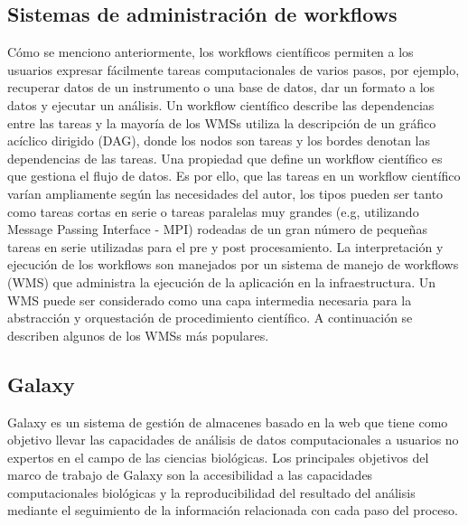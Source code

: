 


\subsection{Sistemas de administración de workflows}

Cómo se menciono anteriormente, los workflows científicos permiten a los usuarios expresar fácilmente tareas computacionales de varios pasos, por ejemplo, recuperar datos de un instrumento o una base de datos, dar un formato a los datos y ejecutar un análisis. 
Un workflow científico describe las dependencias entre las tareas y la mayoría de los WMSs utiliza la descripción de un gráfico acíclico dirigido (DAG), donde los nodos son tareas y los bordes denotan las dependencias de las tareas.
Una propiedad que define un workflow científico es que gestiona el flujo de datos. Es por ello, que las tareas en un  workflow científico varían ampliamente según las necesidades del autor, los tipos pueden ser tanto como tareas cortas en serie o tareas paralelas muy grandes (e.g, utilizando Message Passing Interface - MPI) rodeadas de un gran número de pequeñas tareas en serie utilizadas para el pre y post procesamiento.
La interpretación y ejecución de los workflows son manejados por un sistema de manejo de workflows (WMS) que administra la ejecución de la aplicación en la infraestructura. 
Un WMS puede ser considerado como una capa intermedia necesaria para la abstracción y orquestación de procedimiento científico. A continuación se describen algunos de los WMSs más populares.

\subsection{Galaxy}	
Galaxy \cite{goecks2010galaxy} es un sistema de gestión de almacenes basado en la web que tiene como objetivo llevar las capacidades de análisis de datos computacionales a usuarios no expertos en el campo de las ciencias biológicas. Los principales objetivos del marco de trabajo de Galaxy son la accesibilidad a las capacidades computacionales biológicas y la reproducibilidad del resultado del análisis mediante el seguimiento de la información relacionada con cada paso del proceso. 

